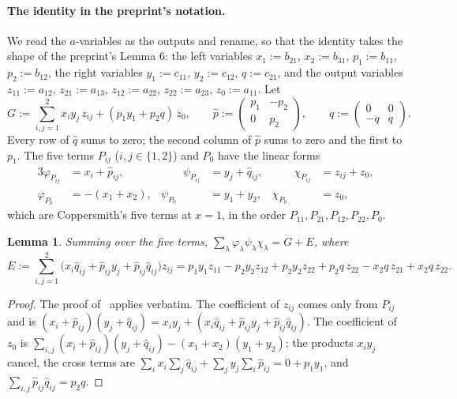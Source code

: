 \documentclass[11pt]{article}
\newtheorem{lemma}[theorem]{Lemma}
\theoremstyle{definition}
\theoremstyle{remark}
\begin{document}
\paragraph{The identity in the preprint's notation.} We read the $a$-variables as the outputs and rename, so that the identity takes the shape of the preprint's Lemma 6: the left variables $x_1:=b_{21}$, $x_2:=b_{31}$, $p_1:=b_{11}$, $p_2:=b_{12}$, the right variables $y_1:=c_{11}$, $y_2:=c_{12}$, $q:=c_{21}$, and the output variables $z_{11}:=a_{12}$, $z_{21}:=a_{13}$, $z_{12}:=a_{22}$, $z_{22}:=a_{23}$, $z_0:=a_{11}$. Let
\[
G:=\sum_{i,j=1}^2x_iy_j\,z_{ij}+(p_1y_1+p_2q)\,z_0,\qquad
\hat p:=\begin{pmatrix}p_1&-p_2\\0&p_2\end{pmatrix},\qquad \hat q:=\begin{pmatrix}0&0\\-q&q\end{pmatrix}.
\]
Every row of $\hat q$ sums to zero; the second column of $\hat p$ sums to zero and the first to $p_1$. The five terms $P_{ij}$ ($i,j\in\{1,2\}$) and $P_0$ have the linear forms
\begin{alignat*}{3}
\varphi_{P_{ij}}&=x_i+\hat p_{ij}, &\qquad \psi_{P_{ij}}&=y_j+\hat q_{ij}, &\qquad \chi_{P_{ij}}&=z_{ij}+z_0,\\
\varphi_{P_0}&=-(x_1+x_2), & \psi_{P_0}&=y_1+y_2, & \chi_{P_0}&=z_0,
\end{alignat*}
which are Coppersmith's five terms at $x=1$, in the order $P_{11},P_{21},P_{12},P_{22},P_0$.

\begin{lemma}\label{m:lem:identity}
Summing over the five terms, $\sum_\lambda\varphi_\lambda\psi_\lambda\chi_\lambda=G+E$, where
\[
E:=\sum_{i,j=1}^2\big(x_i\hat q_{ij}+\hat p_{ij}y_j+\hat p_{ij}\hat q_{ij}\big)z_{ij}
=p_1y_1z_{11}-p_2y_2z_{12}+p_2y_2z_{22}+p_2q\,z_{22}-x_2q\,z_{21}+x_2q\,z_{22}.
\]
\end{lemma}

\begin{proof}
The proof of~\cite[Lemma 6]{ZT} applies verbatim. The coefficient of $z_{ij}$ comes only from $P_{ij}$ and is $(x_i+\hat p_{ij})(y_j+\hat q_{ij})=x_iy_j+(x_i\hat q_{ij}+\hat p_{ij}y_j+\hat p_{ij}\hat q_{ij})$. The coefficient of $z_0$ is $\sum_{i,j}(x_i+\hat p_{ij})(y_j+\hat q_{ij})-(x_1+x_2)(y_1+y_2)$; the products $x_iy_j$ cancel, the cross terms are $\sum_ix_i\sum_j\hat q_{ij}+\sum_jy_j\sum_i\hat p_{ij}=0+p_1y_1$, and $\sum_{i,j}\hat p_{ij}\hat q_{ij}=p_2q$.
\end{proof}
\end{document}
